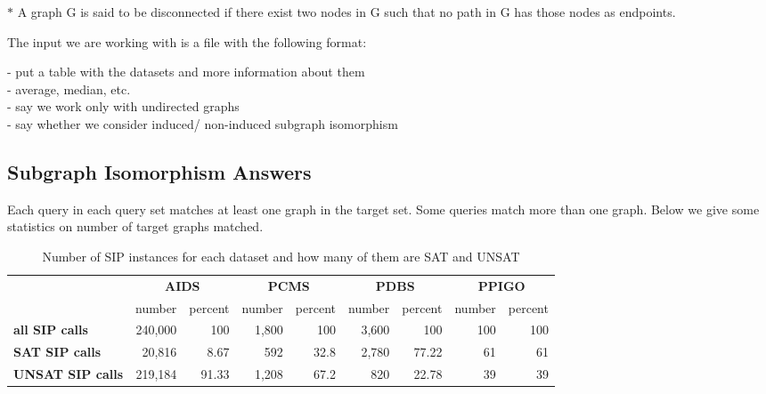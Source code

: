 \documentclass{l4proj}
\begin{document}
\small{$*$ A graph G is said to be disconnected if there exist two nodes in G such that no path in G has those nodes as endpoints.}

    The input we are working with is a file with the following format:\newline
    
    - put a table with the datasets and more information about them \\ 
    - average, median, etc. \\
    - say we work only with undirected graphs \\
    - say whether we consider induced/ non-induced subgraph isomorphism \\

\subsection{Subgraph Isomorphism Answers}
Each query in each query set matches at least one graph in the target set. Some queries match more than one graph. Below we give some statistics on number of target graphs matched.

\begin{table}
\centering
        \renewcommand{\arraystretch}{1.5}%
        \begin{tabular}{l|r|r|r|r|r|r|r|r|}
            \cline{2-9}
            &
             \multicolumn{2}{c}{\textbf{AIDS}} & 
             \multicolumn{2}{|c}{\textbf{PCMS}} & 
             \multicolumn{2}{|c|}{\textbf{PDBS}} & 
             \multicolumn{2}{c|}{\textbf{PPIGO}} \\
            \cline{2-9}
              & number  & percent & number & percent & number & percent & number & percent \\
              \hline
            \multicolumn{1}{|l|}{\textbf{all SIP calls}}  &240,000   &100 &1,800 &100 &3,600 &100 &100 &100 \\
            \multicolumn{1}{|l|}{\textbf{SAT SIP calls}}  &20,816 &8.67 &592 &32.8 &2,780 &77.22 &61 &61 \\
            \multicolumn{1}{|l|}{\textbf{UNSAT SIP calls}} &219,184 &91.33 &1,208 &67.2 &820 &22.78 &39 &39 \\
            \hline
        \end{tabular}
        \caption{Number of SIP instances for each dataset and how many of them are SAT and UNSAT}
        \label{table:dataSAT}
    \end{table}
\end{document}
